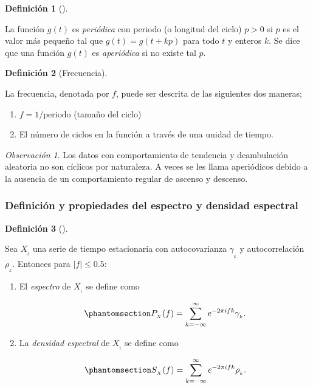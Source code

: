 \documentclass[
  us-letterpaper,
]{scrreprt}
\theoremstyle{plain}
\theoremstyle{definition}
\theoremstyle{plain}
\theoremstyle{definition}
\newtheorem{definition}{Definición}[chapter]
\theoremstyle{remark}
\newtheorem*{remark}{Observación}
\begin{document}
\begin{definition}[]\protect\hypertarget{def-aper}{}\label{def-aper}

La función \(g(t)\) es \emph{periódica} con periodo (o longitud del
ciclo) \(p > 0\) si \(p\) es el valor más pequeño tal que
\(g(t) = g(t + kp)\) para todo \(t\) y enteros \(k\). Se dice que una
función \(g(t)\) es \emph{aperiódica} si no existe tal \(p\).

\end{definition}

\begin{definition}[Frecuencia]\protect\hypertarget{def-freq}{}\label{def-freq}

La frecuencia, denotada por \(f\), puede ser descrita de las siguientes
dos maneras;

\begin{enumerate}
\def\labelenumi{\arabic{enumi}.}
\item
  \(f=1/\text{periodo}\) (tamaño del ciclo)
\item
  El número de ciclos en la función a través de una unidad de tiempo.
\end{enumerate}

\end{definition}

\begin{remark}
Los datos con comportamiento de tendencia y deambulación aleatoria no
son cíclicos por naturaleza. A veces se les llama aperiódicos debido a
la ausencia de un comportamiento regular de ascenso y descenso.
\end{remark}

\subsubsection{Definición y propiedades del espectro y densidad
espectral}\label{definiciuxf3n-y-propiedades-del-espectro-y-densidad-espectral}

\begin{definition}[]\protect\hypertarget{def-spec}{}\label{def-spec}

Sea \(X_{_t}\) una serie de tiempo estacionaria con autocovarianza
\(\gamma_{_k}\) y autocorrelación \(\rho_{_k}\). Entonces para
\(|f|\le 0.5\):

\begin{enumerate}
\def\labelenumi{\roman{enumi}.}
\item
  El \emph{espectro} de \(X_{_t}\) se define como

  \begin{equation}\phantomsection\label{eq-spectrum}{
  P_{_X}(f)=\sum_{k=-\infty}^\infty e^{-2\pi ifk}\gamma_{_k}.
  }\end{equation}
\item
  La \emph{densidad espectral} de \(X_{_t}\) se define como

  \begin{equation}\phantomsection\label{eq-spectden}{
  S_{_X}(f)=\sum_{k=-\infty}^\infty e^{-2\pi ifk}\rho_{_k}.
  }\end{equation}
\end{enumerate}

\end{definition}
\end{document}
